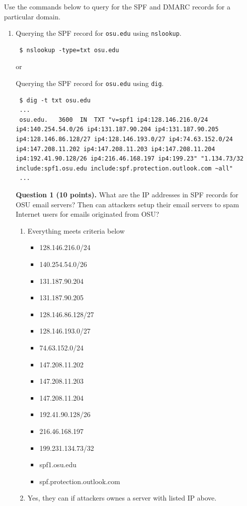 \documentclass[11pt]{article}
\newcommand{\dmark}{{\sf DMARC}\xspace}
\newcommand{\spf}{{\sf SPF}\xspace}
\begin{document}
Use the commands below to query for the \spf and \dmark records for a particular domain.
\begin{enumerate}
\item Querying the \spf record for \texttt{osu.edu} using \texttt{nslookup}.
 \begin{lstlisting}
 $ nslookup -type=txt osu.edu
\end{lstlisting}\vspace{-6mm}
 or

 Querying the \spf record for \texttt{osu.edu} using \texttt{dig}.
 \begin{lstlisting}
 $ dig -t txt osu.edu
 ...
 osu.edu.   3600  IN  TXT "v=spf1 ip4:128.146.216.0/24 ip4:140.254.54.0/26 ip4:131.187.90.204 ip4:131.187.90.205 ip4:128.146.86.128/27 ip4:128.146.193.0/27 ip4:74.63.152.0/24 ip4:147.208.11.202 ip4:147.208.11.203 ip4:147.208.11.204 ip4:192.41.90.128/26 ip4:216.46.168.197 ip4:199.23" "1.134.73/32 include:spf1.osu.edu include:spf.protection.outlook.com ~all"
 ...
\end{lstlisting}\vspace{-6mm}

\textbf{Question 1 (10 points).} What are the IP addresses in \spf records for OSU email servers? Then can attackers setup their email servers to spam Internet users for emails originated from OSU?
\begin{enumerate}
  \item Everything meets criteria below
  \begin{itemize}
    \item 128.146.216.0/24
    \item 140.254.54.0/26
    \item 131.187.90.204
    \item 131.187.90.205
    \item 128.146.86.128/27
    \item 128.146.193.0/27
    \item 74.63.152.0/24
    \item 147.208.11.202
    \item 147.208.11.203
    \item 147.208.11.204
    \item 192.41.90.128/26
    \item 216.46.168.197
    \item 199.231.134.73/32
    \item spf1.osu.edu
    \item spf.protection.outlook.com
  \end{itemize}
  \item Yes, they can if attackers ownes a server with listed IP above.
\end{enumerate}


\end{enumerate}
\end{document}
